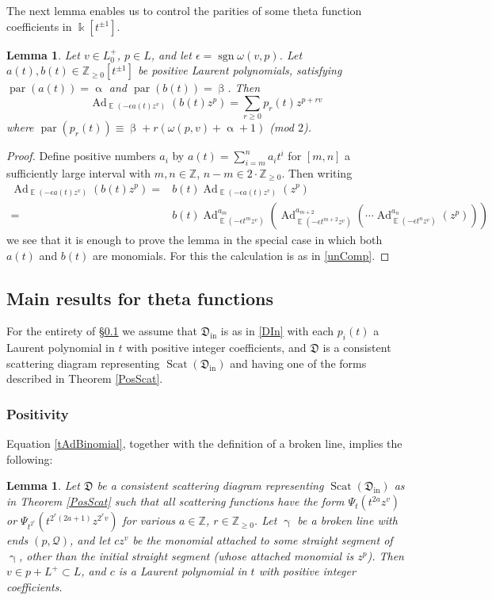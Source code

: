 \documentclass{amsart}
\DeclareMathOperator{\parit}{par}
\DeclareMathOperator{\sign}{sgn}
\DeclareMathOperator{\In}{in}
\DeclareMathOperator{\EE}{\mathbb{E}}
\DeclareMathOperator{\Ad}{Ad}
\DeclareMathOperator{\scat}{Scat}
\let\bb=\mathbb
\let\f=\mathfrak
\newcommand {\kk} {\Bbbk}
\newcommand {\sQ} {\mathcal{Q}}
\renewcommand{\alpha}{\upalpha}
\renewcommand{\beta}{\upbeta}
\renewcommand{\gamma}{\upgamma}
\theoremstyle{plain}%
\newtheorem{lem}[thm]{Lemma}
\theoremstyle{definition}
\theoremstyle{remark}
\begin{document}
The next lemma enables us to control the parities of some theta function coefficients in $\kk[t^{\pm 1}]$.
\begin{lem}\label{parity_prop}
Let $v\in L_0^+$, $p\in L$, and let $\epsilon=\sign \omega(v,p)$.  Let $a(t),b(t)\in\bb{Z}_{\geq 0}[t^{\pm 1}]$ be positive Laurent polynomials, satisfying $\parit(a(t))=\alpha$ and $\parit(b(t))=\beta$.  Then
\[
\Ad_{\EE\left(-\epsilon a(t)z^v\right)}(b(t)z^p)=\sum_{r\geq 0} p_r(t)z^{p+rv}
\]
where $\parit(p_r(t))\equiv\beta+r(\omega(p,v) + \alpha+1)$ (mod $2$). 
\end{lem}
\begin{proof}
Define positive numbers $a_i$ by $a(t)=\sum_{i=m}^n a_it^i$ for $[m,n]$ a sufficiently large interval with $m,n\in \bb{Z}$, $n-m\in 2\cdot\bb{Z}_{\geq 0}$.  Then writing
\begin{align*}
\Ad_{\EE\left(-\epsilon a(t)z^v\right)}(b(t)z^p)=&b(t)\Ad_{\EE\left(-\epsilon a(t)z^v\right)}(z^p)\\
=&b(t)\Ad_{\EE\left(-\epsilon t^m z^v\right)}^{a_m}\left( \Ad_{\EE\left(-\epsilon t^{m+2}z^v \right)}^{a_{m+2}}\left(\cdots \Ad_{\EE\left(-\epsilon t^nz^v \right)}^{a_n}\left(z^p\right)\right)\right)
\end{align*}
we see that it is enough to prove the lemma in the special case in which both $a(t)$ and $b(t)$ are monomials.  For this the calculation is as in \eqref{unComp}.
\end{proof}



\subsection{Main results for theta functions}\label{PosTheta}

For the entirety of \S \ref{PosTheta} we assume that $\f{D}_{\In}$ is as in \eqref{DIn} with each $p_i(t)$ a Laurent polynomial in $t$ with positive integer coefficients, and $\f{D}$ is a consistent scattering diagram representing $\scat(\f{D}_{\In})$ and having one of the forms described in Theorem \ref{PosScat}.

\subsubsection{Positivity}
Equation \eqref{tAdBinomial}, together with the definition of a broken line, implies the following:


\begin{lem}\label{BrokenPos}
Let $\f{D}$ be a consistent scattering diagram representing $\scat(\f{D}_{\In})$ as in Theorem \ref{PosScat} such that all scattering functions have the form $\Psi_t(t^{2a}z^v)$ or $\Psi_{t^{2^r}}(t^{2^r(2a+1)}z^{2^r v})$ for various $a\in \bb{Z}$, $r\in \bb{Z}_{\geq 0}$.  Let $\gamma$ be a broken line with ends $(p,\sQ)$, and let $cz^{v}$ be the monomial attached to some straight segment of $\gamma$, other than the initial straight segment (whose attached monomial is $z^p$).  Then $v\in p+L^{+}\subset L$, and $c$ is a Laurent polynomial in $t$ with positive integer coefficients.
\end{lem}
\end{document}
